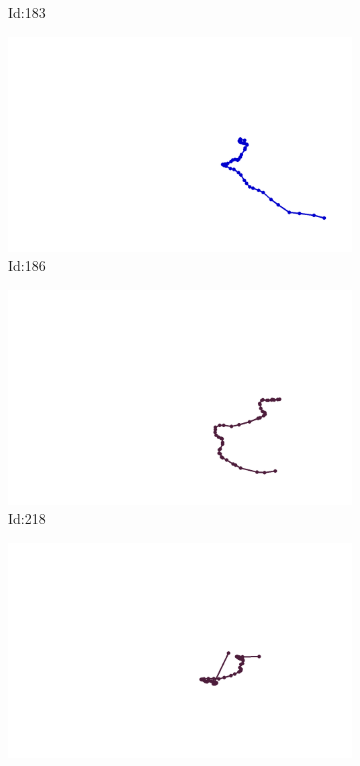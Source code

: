 \documentclass[12pt,twoside]{report}
\begin{document}
\begin{figure}
\begin{subfigure}[b]{0.20\textwidth}
\caption{Id:183}
\end{subfigure}
\begin{subfigure}[b]{0.20\textwidth}
\centering
\includegraphics[width=\textwidth]{../trajectories/186.png}
\caption{Id:186}
\end{subfigure}
\begin{subfigure}[b]{0.20\textwidth}
\centering
\includegraphics[width=\textwidth]{../trajectories/218.png}
\caption{Id:218}
\end{subfigure}
\begin{subfigure}[b]{0.20\textwidth}
\centering
\includegraphics[width=\textwidth]{../trajectories/281.png}

\end{subfigure}
\end{figure}
\end{document}
